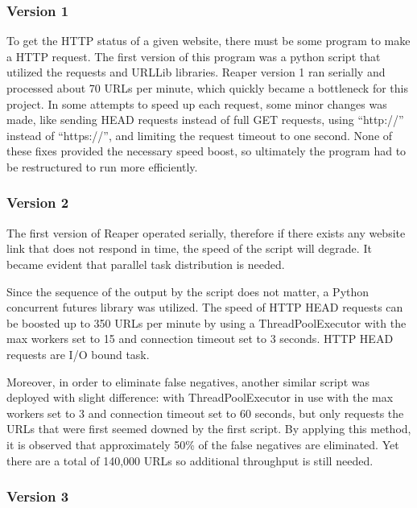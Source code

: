 \documentclass[conference]{IEEEtran}
\begin{document}
\subsubsection{Version 1}

To get the HTTP status of a given website, there must be some program to make a HTTP request. The first version of this program was a python script that utilized the requests and URLLib libraries. Reaper version 1 ran serially and processed about 70 URLs per minute, which quickly became a bottleneck for this project. In some attempts to speed up each request, some minor changes was made, like sending HEAD requests instead of full GET requests, using ``http://'' instead of ``https://'', and limiting the request timeout to one second. None of these fixes provided the necessary speed boost, so ultimately the program had to be restructured to run more efficiently.

\subsubsection{Version 2}

The first version of Reaper operated serially, therefore if there exists any website link that does not respond in time, the speed of the script will degrade. It became evident that parallel task distribution is needed. 

Since the sequence of the output by the script does not matter, a Python concurrent futures library was utilized. The speed of HTTP HEAD requests can be boosted up to 350 URLs per minute by using a ThreadPoolExecutor with the max workers set to 15 and connection timeout set to 3 seconds. HTTP HEAD requests are I/O bound task.

Moreover, in order to eliminate false negatives, another similar script was deployed with slight difference: with ThreadPoolExecutor in use with the max workers set to 3 and connection timeout set to 60 seconds, but only requests the URLs that were first seemed downed by the first script. By applying this method, it is observed that approximately 50\% of the false negatives are eliminated. Yet there are a total of 140,000 URLs so additional throughput is still needed.

\subsubsection{Version 3}
\end{document}
